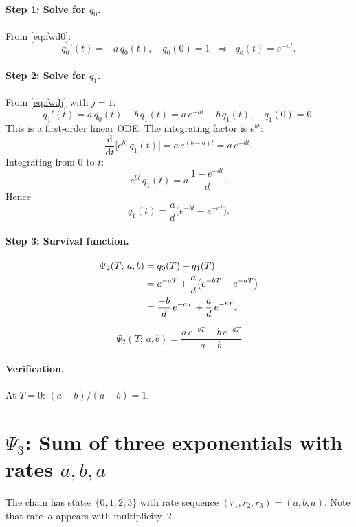 \documentclass[11pt,a4paper]{article}
\newcommand{\dd}{\mathrm{d}}
\begin{document}
\paragraph{Step 1: Solve for $q_0$.}
From \eqref{eq:fwd0}:
\[
  q_0'(t) = -a\, q_0(t), \quad q_0(0) = 1
  \;\;\Longrightarrow\;\;
  q_0(t) = e^{-at}.
\]

\paragraph{Step 2: Solve for $q_1$.}
From \eqref{eq:fwdj} with $j=1$:
\[
  q_1'(t) = a\, q_0(t) - b\, q_1(t) = a\, e^{-at} - b\, q_1(t), \quad q_1(0) = 0.
\]
This is a first-order linear ODE.  The integrating factor is $e^{bt}$:
\[
  \frac{\dd}{\dd t}\bigl[e^{bt}\, q_1(t)\bigr] = a\, e^{(b-a)t} = a\, e^{-dt}.
\]
Integrating from $0$ to $t$:
\[
  e^{bt}\, q_1(t) = a\,\frac{1 - e^{-dt}}{d}.
\]
Hence
\[
  q_1(t) = \frac{a}{d}\bigl(e^{-bt} - e^{-at}\bigr).
\]

\paragraph{Step 3: Survival function.}
\begin{align}
  \Psi_2(T;\, a, b)
  &= q_0(T) + q_1(T) \notag\\
  &= e^{-aT} + \frac{a}{d}\bigl(e^{-bT} - e^{-aT}\bigr) \notag\\
  &= \frac{-b}{d}\,e^{-aT} + \frac{a}{d}\,e^{-bT}.
\end{align}

\begin{equation}
\boxed{\;\Psi_2(T;\, a, b) = \frac{a\,e^{-bT} - b\,e^{-aT}}{a - b}\;}
\label{eq:psi2}
\end{equation}

\paragraph{Verification.} At $T = 0$: $(a - b)/(a - b) = 1$. \checkmark

\section{$\Psi_3$: Sum of three exponentials with rates $a, b, a$}

The chain has states $\{0, 1, 2, 3\}$ with rate sequence $(r_1, r_2, r_3) = (a, b, a)$.
Note that rate~$a$ appears with multiplicity~2.
\end{document}
